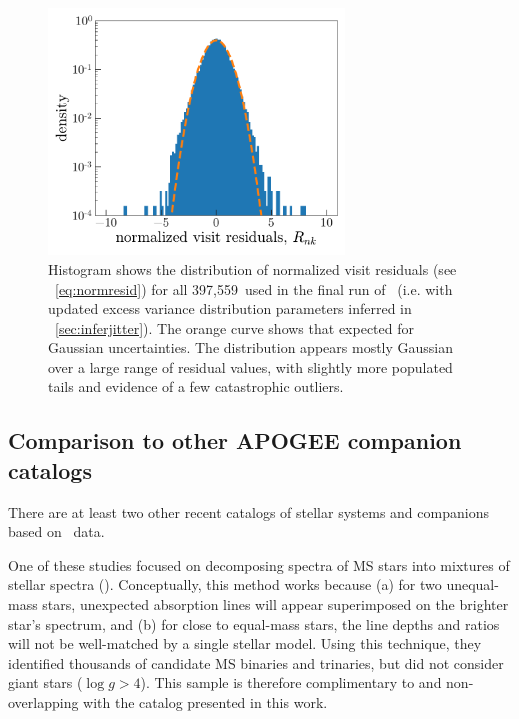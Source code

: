 \documentclass[modern, letterpaper]{aastex62}
\newcommand{\apogee}{\project{\acronym{APOGEE}}}
\newcommand{\thejoker}{\project{The~Joker}}
\newcommand{\nvisits}{397,559}
\begin{document}
\begin{figure}[h]
\begin{center}
\includegraphics[width=0.7\textwidth]{residuals}
\end{center}
\caption{%
Histogram shows the distribution of normalized visit residuals (see
\eqname~\ref{eq:normresid}) for all \nvisits\ used in the final run of
\thejoker\ (i.e. with updated excess variance distribution parameters inferred
in \sectionname~\ref{sec:inferjitter}).
The orange curve shows that expected for Gaussian uncertainties.
The distribution appears mostly Gaussian over a large range of residual values,
with slightly more populated tails and evidence of a few catastrophic outliers.
\label{fig:residuals}
}
\end{figure}


\subsection{Comparison to other APOGEE companion catalogs}
\label{sec:compare-troup}

There are at least two other recent catalogs of stellar systems and companions
based on \apogee\ data.

One of these studies focused on decomposing spectra of MS stars into mixtures of
stellar spectra (\citealt{El-Badry:2018}).
Conceptually, this method works because (a) for two unequal-mass stars,
unexpected absorption lines will appear superimposed on the brighter star's
spectrum, and (b) for close to equal-mass stars, the line depths and ratios will
not be well-matched by a single stellar model.
Using this technique, they identified thousands of candidate MS binaries and
trinaries, but did not consider giant stars ($\log g > 4$).
This sample is therefore complimentary to and non-overlapping with the catalog
presented in this work.
\end{document}
